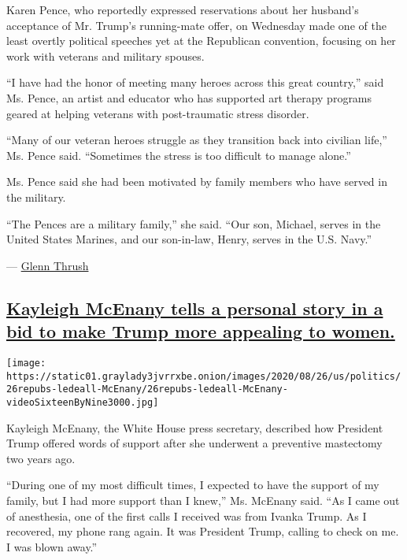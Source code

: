 Karen Pence, who reportedly expressed reservations about her husband's
acceptance of Mr. Trump's running-mate offer, on Wednesday made one of
the least overtly political speeches yet at the Republican convention,
focusing on her work with veterans and military spouses.

``I have had the honor of meeting many heroes across this great
country,'' said Ms. Pence, an artist and educator who has supported art
therapy programs geared at helping veterans with post-traumatic stress
disorder.

``Many of our veteran heroes struggle as they transition back into
civilian life,'' Ms. Pence said. ``Sometimes the stress is too difficult
to manage alone.''

Ms. Pence said she had been motivated by family members who have served
in the military.

``The Pences are a military family,'' she said. ``Our son, Michael,
serves in the United States Marines, and our son-in-law, Henry, serves
in the U.S. Navy.''

--- \href{https://www.nytimes3xbfgragh.onion/by/glenn-thrush}{Glenn
Thrush}

\hypertarget{kayleigh-mcenany-tells-a-personal-story-in-a-bid-to-make-trump-more-appealing-to-women}{%
\subsection{\texorpdfstring{\protect\hyperlink{kayleigh-mcenany-tells-a-personal-story-in-a-bid-to-make-trump-more-appealing-to-women}{Kayleigh
McEnany tells a personal story in a bid to make Trump more appealing to
women.}}{Kayleigh McEnany tells a personal story in a bid to make Trump more appealing to women.}}\label{kayleigh-mcenany-tells-a-personal-story-in-a-bid-to-make-trump-more-appealing-to-women}}

\texttt{[image: https://static01.graylady3jvrrxbe.onion/images/2020/08/26/us/politics/26repubs-ledeall-McEnany/26repubs-ledeall-McEnany-videoSixteenByNine3000.jpg]}

Kayleigh McEnany, the White House press secretary, described how
President Trump offered words of support after she underwent a
preventive mastectomy two years ago.

``During one of my most difficult times, I expected to have the support
of my family, but I had more support than I knew,'' Ms. McEnany said.
``As I came out of anesthesia, one of the first calls I received was
from Ivanka Trump. As I recovered, my phone rang again. It was President
Trump, calling to check on me. I was blown away.''

